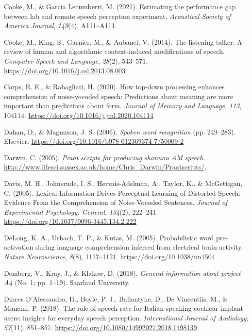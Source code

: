 \documentclass[a4paper, nobind]{templates/ociamthesis}
\newlength{\cslhangindent}
\newenvironment{CSLReferences}[2] %
 {%
  \setlength{\parindent}{0pt}
  \ifodd #1
  \let\oldpar\par
  \def\par{\hangindent=\cslhangindent\oldpar}
  \fi
  \setlength{\parskip}{1mm}
  \setlength{\baselineskip}{6mm}
 }%
 {}
\begin{document}
\begin{CSLReferences}{1}{0}
\leavevmode{}%
Cooke, M., \& Garcia Lecumberri, M. (2021). Estimating the performance gap between lab and remote speech perception experiment. \emph{Acoustical Society of America Journal}, \emph{149}(4), A111--A111.

\leavevmode{}%
Cooke, M., King, S., Garnier, M., \& Aubanel, V. (2014). {The listening talker: A review of human and algorithmic context-induced modifications of speech}. \emph{Computer Speech and Language}, \emph{28}(2), 543--571. \url{https://doi.org/10.1016/j.csl.2013.08.003}

\leavevmode{}%
Corps, R. E., \& Rabagliati, H. (2020). How top-down processing enhances comprehension of noise-vocoded speech: Predictions about meaning are more important than predictions about form. \emph{Journal of Memory and Language}, \emph{113}, 104114. \url{https://doi.org/10.1016/j.jml.2020.104114}

\leavevmode{}%
Dahan, D., \& Magnuson, J. S. (2006). \emph{Spoken word recognition} (pp. 249--283). Elsevier. \url{https://doi.org/10.1016/b978-012369374-7/50009-2}

\leavevmode{}%
Darwin, C. (2005). \emph{Praat scripts for producing shannon AM speech}. \url{http://www.lifesci.sussex.ac.uk/home/Chris_Darwin/Praatscripts/}.

\leavevmode{}%
Davis, M. H., Johnsrude, I. S., Hervais-Adelman, A., Taylor, K., \& McGettigan, C. (2005). Lexical Information Drives Perceptual Learning of Distorted Speech: Evidence From the Comprehension of Noise-Vocoded Sentences. \emph{Journal of Experimental Psychology: General}, \emph{134}(2), 222--241. \url{https://doi.org/10.1037/0096-3445.134.2.222}

\leavevmode{}%
DeLong, K. A., Urbach, T. P., \& Kutas, M. (2005). Probabilistic word pre-activation during language comprehension inferred from electrical brain activity. \emph{Nature Neuroscience}, \emph{8}(8), 1117--1121. \url{https://doi.org/10.1038/nn1504}

\leavevmode{}%
Demberg, V., Kray, J., \& Klakow, D. (2018). \emph{{General information about project A4}} (No. 1; pp. 1--19). Saarland University.

\leavevmode{}%
Dincer D'Alessandro, H., Boyle, P. J., Ballantyne, D., De Vincentiis, M., \& Mancini, P. (2018). {The role of speech rate for Italian-speaking cochlear implant users: insights for everyday speech perception}. \emph{International Journal of Audiology}, \emph{57}(11), 851--857. \url{https://doi.org/10.1080/14992027.2018.1498139}


\end{CSLReferences}
\end{document}
